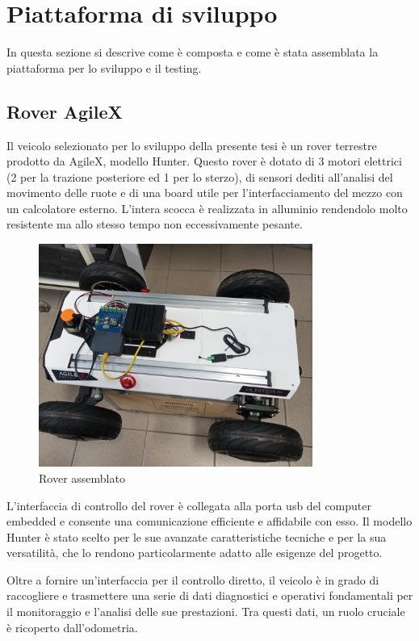 \section{Piattaforma di sviluppo}
In questa sezione si descrive come è composta e come è stata assemblata la piattaforma per lo sviluppo e il testing.

\subsection{Rover AgileX}
Il veicolo selezionato per lo sviluppo della presente tesi è un rover terrestre prodotto da AgileX, modello Hunter. Questo rover è dotato di 3 motori elettrici (2 per la trazione posteriore ed 1 per lo sterzo), di sensori dediti all'analisi del movimento delle ruote e di una board utile per l'interfacciamento del mezzo con un calcolatore esterno. L'intera scocca è realizzata in alluminio rendendolo molto resistente ma allo stesso tempo non eccessivamente pesante.

\begin{figure}[H]
  \centering
  \includegraphics[width=0.8\textwidth]{figures/franco.png}
  \caption{Rover assemblato}
  \label{Rover assemblato}
\end{figure}

\noindent L'interfaccia di controllo del rover è collegata alla porta usb del computer embedded e consente una comunicazione efficiente e affidabile con esso. Il modello Hunter è stato scelto per le sue avanzate caratteristiche tecniche e per la sua versatilità, che lo rendono particolarmente adatto alle esigenze del progetto.

\noindent Oltre a fornire un'interfaccia per il controllo diretto, il veicolo è in grado di raccogliere e trasmettere una serie di dati diagnostici e operativi fondamentali per il monitoraggio e l'analisi delle sue prestazioni. Tra questi dati, un ruolo cruciale è ricoperto dall'odometria. 

